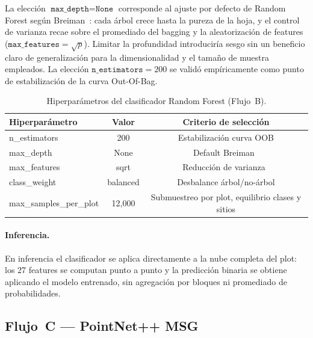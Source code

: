 \documentclass[runningheads]{llncs}
\begin{document}
La elecci\'on $\texttt{max\_depth}=\texttt{None}$ corresponde al ajuste por defecto de Random Forest seg\'un Breiman~\cite{breiman2001}: cada \'arbol crece hasta la pureza de la hoja, y el control de varianza recae sobre el promediado del bagging y la aleatorizaci\'on de features ($\texttt{max\_features}=\sqrt{p}$). Limitar la profundidad introducir\'ia sesgo sin un beneficio claro de generalizaci\'on para la dimensionalidad y el tama\~no de muestra empleados. La elecci\'on $\texttt{n\_estimators}=200$ se valid\'o emp\'iricamente como punto de estabilizaci\'on de la curva Out-Of-Bag.

\begin{table}[t]
\centering
\caption{Hiperpar\'ametros del clasificador Random Forest (Flujo~B).}\label{tab:rf-hp}
\begin{tabular}{lcc}
\toprule
Hiperpar\'ametro & Valor & Criterio de selecci\'on \\
\midrule
n\_estimators    & 200       & Estabilizaci\'on curva OOB       \\
max\_depth       & None      & Default Breiman~\cite{breiman2001} \\
max\_features    & sqrt      & Reducci\'on de varianza~\cite{breiman2001} \\
class\_weight    & balanced  & Desbalance \'arbol/no-\'arbol      \\
max\_samples\_per\_plot & 12{,}000  & Submuestreo por plot, equilibrio clases y sitios \\
\bottomrule
\end{tabular}
\end{table}

\paragraph{Inferencia.} En inferencia el clasificador se aplica directamente a la nube completa del plot: los 27 features se computan punto a punto y la predicci\'on binaria se obtiene aplicando el modelo entrenado, sin agregaci\'on por bloques ni promediado de probabilidades.

\subsection{Flujo~C --- PointNet++ MSG}
\end{document}
